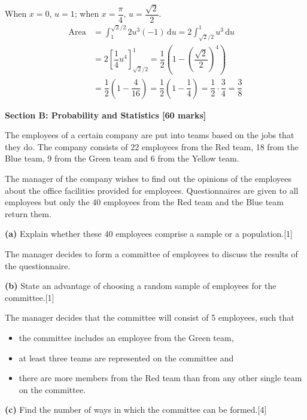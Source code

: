 \documentclass[a4paper,11pt,oneside]{article}
\newcommand{\Qhead}[1]{\par\needspace{14\baselineskip}\medskip\noindent{\large\bfseries #1}\par\smallskip}
\newcommand{\partlabel}[1]{\par\needspace{3\baselineskip}\smallskip\noindent\textbf{#1}\quad}
\newcommand{\mk}[1]{\hfill[#1]}
\begin{document}
\begin{solbox}
When $x=0$, $u=1$; when $x=\dfrac{\pi}{4}$, $u=\dfrac{\sqrt{2}}{2}$.
\begin{align*}
\text{Area}
&= \int_{1}^{\sqrt{2}/2} 2u^3(-1)\,\mathrm{d}u
= 2\int_{\sqrt{2}/2}^{1} u^3\,\mathrm{d}u\\
&= 2\left[\dfrac{1}{4}u^4\right]_{\sqrt{2}/2}^{1}
= \dfrac{1}{2}\left(1 - \left(\dfrac{\sqrt{2}}{2}\right)^4\right)\\
&= \dfrac{1}{2}\left(1 - \dfrac{4}{16}\right)
= \dfrac{1}{2}\left(1 - \dfrac{1}{4}\right)
= \dfrac{1}{2}\cdot\dfrac{3}{4}
= \dfrac{3}{8}
\end{align*}
\end{solbox}
\clearpage
\noindent\textbf{Section B: Probability and Statistics [60 marks]}
\Qhead{6}
The employees of a certain company are put into teams based on the jobs that they do. The company consists of 22 employees from the Red team, 18 from the Blue team, 9 from the Green team and 6 from the Yellow team.

The manager of the company wishes to find out the opinions of the employees about the office facilities provided for employees. Questionnaires are given to all employees but only the 40 employees from the Red team and the Blue team return them.

\partlabel{(a)}
Explain whether these 40 employees comprise a sample or a population.\mk{1}



The manager decides to form a committee of employees to discuss the results of the questionnaire.

\partlabel{(b)}
State an advantage of choosing a random sample of employees for the committee.\mk{1}



The manager decides that the committee will consist of 5 employees, such that
\begin{itemize}[leftmargin=1.8em,itemsep=0.3ex]
\item the committee includes an employee from the Green team,
\item at least three teams are represented on the committee and
\item there are more members from the Red team than from any other single team on the committee.
\end{itemize}

\partlabel{(c)}
Find the number of ways in which the committee can be formed.\mk{4}
\end{document}
